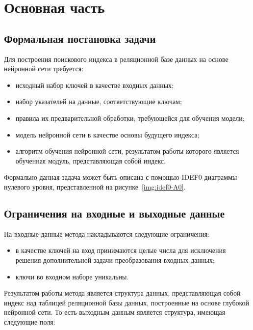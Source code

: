 \chapter{Основная часть}

\section{Формальная постановка задачи}

Для построения поискового индекса в реляционной базе данных на основе нейронной
сети требуется:

\begin{itemize}
    \item исходный набор ключей в качестве входных данных;
    \item набор указателей на данные, соответствующие ключам;
    \item правила их предварительной обработки, требующейся для обучения модели;
    \item модель нейронной сети в качестве основы будущего индекса;
    \item алгоритм обучения нейронной сети, результатом работы которого является
        обученная модуль, представляющая собой индекс.
\end{itemize}

Формально данная задача может быть описана с помощью IDEF0-диаграммы нулевого
уровня, представленной на рисунке~\ref{img:idef0-A0}.


\section{Ограничения на входные и выходные данные}

На входные данные метода накладываются следующие ограничения:

\begin{itemize}
    \item в качестве ключей на вход принимаются целые числа для исключения
        решения дополнительной задачи преобразования входных данных;
    \item ключи во входном наборе уникальны.
\end{itemize}

Результатом работы метода является структура данных, представляющая собой индекс
над таблицей реляционной базы данных, построенные на основе глубокой нейронной
сети. То есть выходным данным является структура, имеющая следующие поля:


